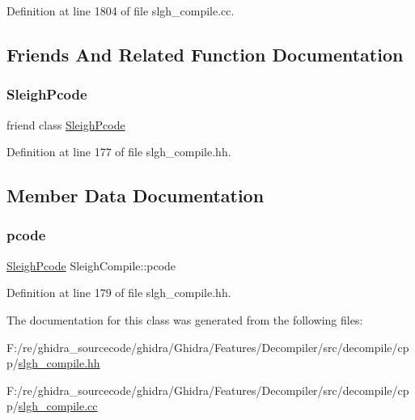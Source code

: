 Definition at line 1804 of file slgh\+\_\+compile.\+cc.



\subsection{Friends And Related Function Documentation}
\mbox{\label{class_sleigh_compile_a1a6174ea5a2d029404c087827849b5d5}} 
\subsubsection{\texorpdfstring{SleighPcode}{SleighPcode}}
{\footnotesize\ttfamily friend class \mbox{\hyperlink{class_sleigh_pcode}{Sleigh\+Pcode}}\hspace{0.3cm}{\ttfamily [friend]}}



Definition at line 177 of file slgh\+\_\+compile.\+hh.



\subsection{Member Data Documentation}
\mbox{\label{class_sleigh_compile_aa733427b680421c7473d0b6f945ff6f2}} 
\subsubsection{\texorpdfstring{pcode}{pcode}}
{\footnotesize\ttfamily \mbox{\hyperlink{class_sleigh_pcode}{Sleigh\+Pcode}} Sleigh\+Compile\+::pcode}



Definition at line 179 of file slgh\+\_\+compile.\+hh.



The documentation for this class was generated from the following files\+:\begin{DoxyCompactItemize}
\item 
F\+:/re/ghidra\+\_\+sourcecode/ghidra/\+Ghidra/\+Features/\+Decompiler/src/decompile/cpp/\mbox{\hyperlink{slgh__compile_8hh}{slgh\+\_\+compile.\+hh}}\item 
F\+:/re/ghidra\+\_\+sourcecode/ghidra/\+Ghidra/\+Features/\+Decompiler/src/decompile/cpp/\mbox{\hyperlink{slgh__compile_8cc}{slgh\+\_\+compile.\+cc}}\end{DoxyCompactItemize}
